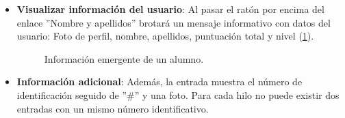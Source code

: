 \documentclass[a4paper, 12pt]{book}
\begin{document}
\begin{itemize}
  Si se presiona sobre el enlace del t\'itulo, se abrir\'a otra pesta\~na con la ubicaci\'on de la propia entrada dentro del blog.
  \item {\bfseries Visualizar informaci\'on del usuario}: Al pasar el rat\'on por encima del enlace ''Nombre y apellidos'' brotar\'a un mensaje informativo 
  con datos del usuario: Foto de perfil, nombre, apellidos, puntuaci\'on total y nivel (\ref{figura:hiloalumno2}).
  \begin{figure}[htbp] 
    \centering
    \caption{Informaci\'on emergente de un alumno.}
    \label{figura:hiloalumno2}
  \end{figure}
  
  \item {\bfseries Informaci\'on adicional}: Adem\'as, la entrada muestra el n\'umero de identificaci\'on seguido de ''\#'' y una foto. Para cada hilo no puede existir
  dos entradas con un mismo n\'umero identificativo.
\end{itemize}
\end{document}
